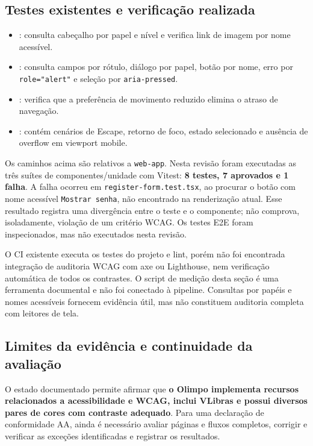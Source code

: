 \documentclass[12pt,a4paper]{article}
\begin{document}
\subsection{Testes existentes e verificação realizada}
\begin{itemize}
  \item {}: consulta cabeçalho por papel e nível e verifica link de imagem por nome acessível.
  \item {}: consulta campos por rótulo, diálogo por papel, botão por nome, erro por \texttt{role="alert"} e seleção por \texttt{aria-pressed}.
  \item {}: verifica que a preferência de movimento reduzido elimina o atraso de navegação.
  \item {}: contém cenários de Escape, retorno de foco, estado selecionado e ausência de overflow em viewport mobile.
\end{itemize}

Os caminhos acima são relativos a \texttt{web-app}. Nesta revisão foram executadas as três suítes de componentes/unidade com Vitest: \textbf{8 testes, 7 aprovados e 1 falha}. A falha ocorreu em \texttt{register-form.test.tsx}, ao procurar o botão com nome acessível \texttt{Mostrar senha}, não encontrado na renderização atual. Esse resultado registra uma divergência entre o teste e o componente; não comprova, isoladamente, violação de um critério WCAG. Os testes E2E foram inspecionados, mas não executados nesta revisão.

O CI existente executa os testes do projeto e lint, porém não foi encontrada integração de auditoria WCAG com axe ou Lighthouse, nem verificação automática de todos os contrastes. O script de medição desta seção é uma ferramenta documental e não foi conectado à pipeline. Consultas por papéis e nomes acessíveis fornecem evidência útil, mas não constituem auditoria completa com leitores de tela.

\subsection{Limites da evidência e continuidade da avaliação}
O estado documentado permite afirmar que \textbf{o Olimpo implementa recursos relacionados a acessibilidade e WCAG, inclui VLibras e possui diversos pares de cores com contraste adequado}. Para uma declaração de conformidade AA, ainda é necessário avaliar páginas e fluxos completos, corrigir e verificar as exceções identificadas e registrar os resultados.
\end{document}
